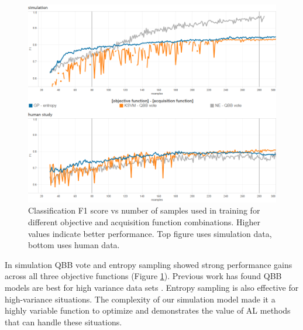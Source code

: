 \documentclass{sig-alternate}
\begin{document}
\begin{figure}[tbph]
\centering
\includegraphics[width=\linewidth]{classification_results}
\caption{Classification F1 score vs number of samples used in training for different objective and acquisition function combinations. Higher values indicate better performance. Top figure uses simulation data, bottom uses human data.}
\label{fig:cls_all}
\end{figure}


In simulation QBB vote and entropy sampling showed strong performance gains across all three objective functions (Figure \ref{fig:cls_all}).
Previous work has found QBB models are best for high variance data sets \cite{schein2007:al-logreg-eval}.
Entropy sampling is also effective for high-variance situations.
The complexity of our simulation model made it a highly variable function to optimize and demonstrates the value of AL methods that can handle these situations.
\end{document}
